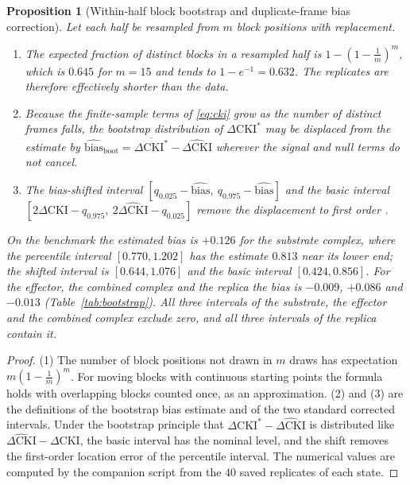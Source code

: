 \documentclass[11pt,reqno]{amsart}
\theoremstyle{plain}
\newtheorem{proposition}[theorem]{Proposition}
\theoremstyle{definition}
\theoremstyle{remark}
\numberwithin{equation}{section}
\newcommand{\DCKI}{\Delta\mathrm{CKI}}
\begin{document}
\begin{proposition}[Within-half block bootstrap and duplicate-frame bias correction]\label{prop:bias}
Let each half be resampled from $m$ block positions with replacement.
\begin{enumerate}[label=\textup{(\arabic*)},leftmargin=*]
\item The expected fraction of distinct blocks in a resampled half is $1-(1-\tfrac1m)^m$, which is $0.645$ for $m=15$ and tends to $1-e^{-1}=0.632$. The replicates are therefore effectively shorter than the data.
\item Because the finite-sample terms of \eqref{eq:cki} grow as the number of distinct frames falls, the bootstrap distribution of $\DCKI^*$ may be displaced from the estimate by $\widehat{\mathrm{bias}}_{\mathrm{boot}}=\overline{\DCKI^*}-\widehat{\DCKI}$ wherever the signal and null terms do not cancel.
\item The bias-shifted interval $[q_{0.025}-\widehat{\mathrm{bias}},\ q_{0.975}-\widehat{\mathrm{bias}}]$ and the basic interval $[2\widehat{\DCKI}-q_{0.975},\ 2\widehat{\DCKI}-q_{0.025}]$ remove the displacement to first order \cite{EfronTibshirani1993}.
\end{enumerate}
On the benchmark the estimated bias is $+0.126$ for the substrate complex, where the percentile interval $[0.770,1.202]$ has the estimate $0.813$ near its lower end; the shifted interval is $[0.644,1.076]$ and the basic interval $[0.424,0.856]$. For the effector, the combined complex and the replica the bias is $-0.009$, $+0.086$ and $-0.013$ (Table~\ref{tab:bootstrap}). All three intervals of the substrate, the effector and the combined complex exclude zero, and all three intervals of the replica contain it.
\end{proposition}

\begin{proof}
(1) The number of block positions not drawn in $m$ draws has expectation $m(1-\tfrac1m)^m$. For moving blocks with continuous starting points the formula holds with overlapping blocks counted once, as an approximation.
(2) and (3) are the definitions of the bootstrap bias estimate and of the two standard corrected intervals. Under the bootstrap principle that $\DCKI^*-\widehat{\DCKI}$ is distributed like $\widehat{\DCKI}-\DCKI$, the basic interval has the nominal level, and the shift removes the first-order location error of the percentile interval. The numerical values are computed by the companion script from the $40$ saved replicates of each state.
\end{proof}
\end{document}
